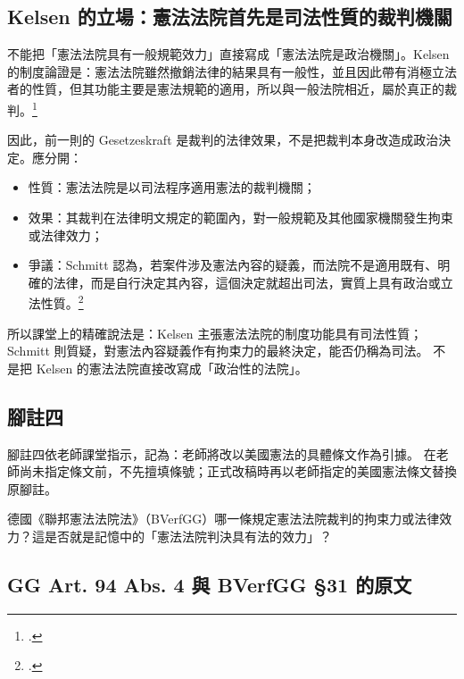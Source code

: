 \subsection{Kelsen 的立場：憲法法院首先是司法性質的裁判機關}

不能把「憲法法院具有一般規範效力」直接寫成「憲法法院是政治機關」。Kelsen 的制度論證是：憲法法院雖然撤銷法律的結果具有一般性，並且因此帶有消極立法者的性質，但其功能主要是憲法規範的適用，所以與一般法院相近，屬於真正的裁判。\footcites[47]{kelsen2015}[56]{kelsen1929}

因此，前一則的 Gesetzeskraft 是裁判的法律效果，不是把裁判本身改造成政治決定。應分開：

\begin{itemize}
\tightlist
\item
  性質：憲法法院是以司法程序適用憲法的裁判機關；
\item
  效果：其裁判在法律明文規定的範圍內，對一般規範及其他國家機關發生拘束或法律效力；
\item
  爭議：Schmitt 認為，若案件涉及憲法內容的疑義，而法院不是適用既有、明確的法律，而是自行決定其內容，這個決定就超出司法，實質上具有政治或立法性質。\footcites[101]{schmitt2015}[31--32]{schmitt1931}
\end{itemize}

所以課堂上的精確說法是：Kelsen 主張憲法法院的制度功能具有司法性質；Schmitt 則質疑，對憲法內容疑義作有拘束力的最終決定，能否仍稱為司法。 不是把 Kelsen 的憲法法院直接改寫成「政治性的法院」。

\subsection{腳註四}

腳註四依老師課堂指示，記為：老師將改以美國憲法的具體條文作為引據。 在老師尚未指定條文前，不先擅填條號；正式改稿時再以老師指定的美國憲法條文替換原腳註。


\begin{qaquestion}
德國《聯邦憲法法院法》（BVerfGG）哪一條規定憲法法院裁判的拘束力或法律效力？這是否就是記憶中的「憲法法院判決具有法的效力」？
\end{qaquestion}

\subsection{GG Art. 94 Abs. 4 與 BVerfGG §31 的原文}

